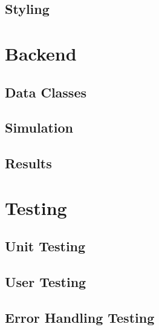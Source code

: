 \documentclass{article}
\begin{document}
    \subsection{Styling}

\section{Backend}

    \subsection{Data Classes}

    \subsection{Simulation}

    \subsection{Results}

\section{Testing}

    \subsection{Unit Testing}

    \subsection{User Testing}

    \subsection{Error Handling Testing}
\end{document}
